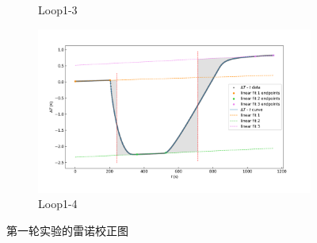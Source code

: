 \documentclass[cn,hazy,pku,12pt,normal,math=newtx,cite=super]{elegantnote}
\begin{document}
\begin{figure}[htbp]
\begin{subfigure}{0.45\textwidth}
        \caption*{Loop1-3}
    \end{subfigure}
    \hfill
    \begin{subfigure}{0.45\textwidth}
        \centering
        \includegraphics[width=\linewidth]{figures/2-4.png}
        \caption*{Loop1-4}
    \end{subfigure}
    \caption{第一轮实验的雷诺校正图}
    \label{fig:3}
\end{figure}
\end{document}
